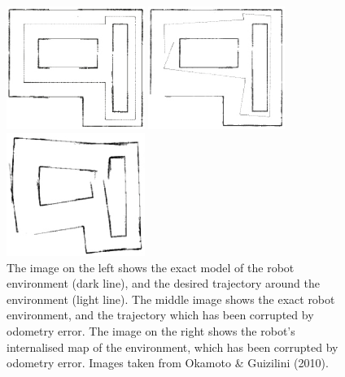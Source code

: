 \documentclass[a4paper]{article}
\begin{document}
\begin{figure}[h]
\centering
\begin{minipage}{0.3\textwidth}
\centering
\includegraphics[height=4cm]{exact}
\end{minipage}
\hspace{0.5cm}
\begin{minipage}{0.3\textwidth}
\centering
\includegraphics[height=4cm]{exact_odom}
\end{minipage}
\hspace{0.5cm}
\begin{minipage}{0.3\textwidth}
\centering
\includegraphics[height=4cm]{odom_error_map}
\end{minipage}
\caption{The image on the left shows the exact model of the robot environment (dark line), and the desired trajectory around the environment (light line). The middle image shows the exact robot environment, and the trajectory which has been corrupted by odometry error. The image on the right shows the robot's internalised map of the environment, which has been corrupted by odometry error. Images taken from Okamoto \& Guizilini (2010).}
\end{figure}
\end{document}

